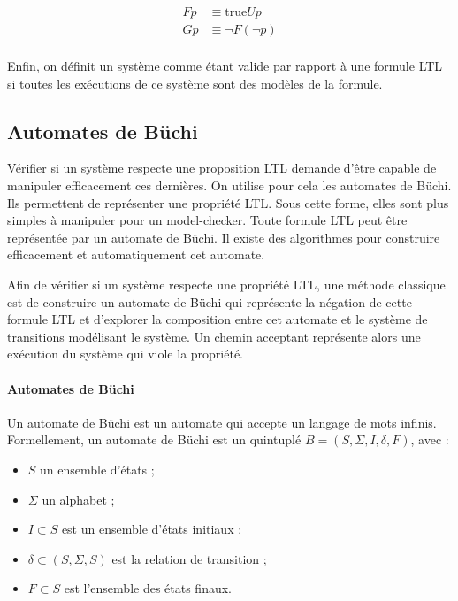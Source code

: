 \[
\begin{aligned}
F p & \equiv \text{true} U p \\
G p & \equiv \lnot F (\lnot p)\\
\end{aligned}
\]

Enfin, on définit un système comme étant valide par rapport à une
formule \ac{LTL} si toutes les exécutions de ce système sont des modèles de
la formule.

\subsection{Automates de Büchi}

Vérifier si un système respecte une proposition \ac{LTL} demande d'être capable de
manipuler efficacement ces dernières. On utilise pour cela les automates de
Büchi. Ils permettent de représenter une propriété \ac{LTL}. Sous cette forme, elles
sont plus simples à manipuler pour un model-checker. Toute formule \ac{LTL} peut être
représentée par un automate de Büchi. Il existe des algorithmes pour construire
efficacement et automatiquement cet automate\citep{ltl2ba}.

Afin de vérifier si un système respecte une propriété \ac{LTL}, une méthode classique
est de construire un automate de Büchi qui représente la négation de cette
formule \ac{LTL} et d'explorer la composition entre cet automate et le système de
transitions modélisant le système. Un chemin acceptant représente alors une
exécution du système qui viole la propriété.

\paragraph{Automates de Büchi}
Un automate de Büchi est un automate qui accepte un langage de mots
infinis. Formellement, un automate de Büchi est un quintuplé
\(B = (S, \Sigma, I, \delta, F)\), avec :

\begin{itemize}
\item
  \(S\) un ensemble d'états ;
\item
  \(\Sigma\) un alphabet ;
\item
  \(I \subset S\) est un ensemble d'états initiaux ;
\item
  \(\delta \subset (S, \Sigma, S)\) est la relation de transition ;
\item
  \(F \subset S\) est l'ensemble des états finaux.
\end{itemize}

